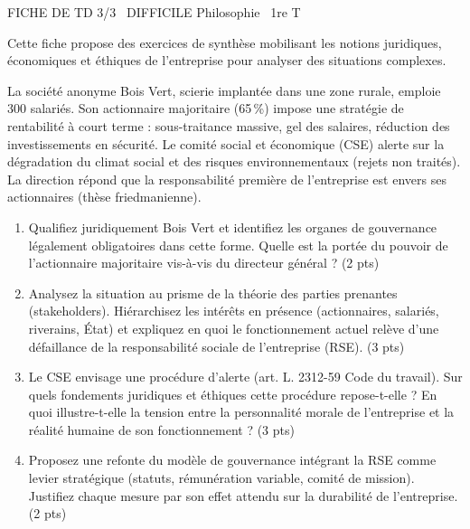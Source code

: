\documentclass[11pt]{article}
\begin{document}
\begin{tcolorbox}[enhanced,colback=popink,colframe=popink,arc=10pt,boxrule=0pt,left=12pt,right=12pt,top=9pt,bottom=9pt]
{\color{white}\popxbold\small FICHE DE TD 3/3 \textbullet\ DIFFICILE \hfill Philosophie \textbullet\ 1re T\par}
\end{tcolorbox}
\vspace{4pt}
Cette fiche propose des exercices de synthèse mobilisant les notions juridiques, économiques et éthiques de l'entreprise pour analyser des situations complexes.

\begin{exercice}
La société anonyme \og{}Bois Vert\fg{}, scierie implantée dans une zone rurale, emploie 300 salariés. Son actionnaire majoritaire (65\,\%) impose une stratégie de rentabilité à court terme : sous-traitance massive, gel des salaires, réduction des investissements en sécurité. Le comité social et économique (CSE) alerte sur la dégradation du climat social et des risques environnementaux (rejets non traités). La direction répond que la \og{}responsabilité première de l'entreprise est envers ses actionnaires\fg{} (thèse friedmanienne).
\begin{enumerate}
    \item Qualifiez juridiquement \og{}Bois Vert\fg{} et identifiez les organes de gouvernance légalement obligatoires dans cette forme. Quelle est la portée du pouvoir de l'actionnaire majoritaire vis-à-vis du directeur général ? (2 pts)
    \item Analysez la situation au prisme de la théorie des parties prenantes (stakeholders). Hiérarchisez les intérêts en présence (actionnaires, salariés, riverains, État) et expliquez en quoi le fonctionnement actuel relève d'une défaillance de la responsabilité sociale de l'entreprise (RSE). (3 pts)
    \item Le CSE envisage une procédure d'alerte (art. L. 2312-59 Code du travail). Sur quels fondements juridiques et éthiques cette procédure repose-t-elle ? En quoi illustre-t-elle la tension entre la personnalité morale de l'entreprise et la réalité humaine de son fonctionnement ? (3 pts)
    \item Proposez une refonte du modèle de gouvernance intégrant la RSE comme levier stratégique (statuts, rémunération variable, comité de mission). Justifiez chaque mesure par son effet attendu sur la durabilité de l'entreprise. (2 pts)
\end{enumerate}
\end{exercice}
\end{document}
